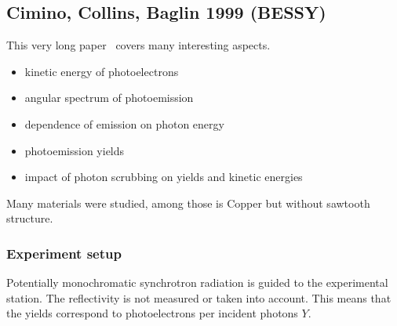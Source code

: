 
\subsection{Cimino, Collins, Baglin 1999 (BESSY)}
\label{sec:Cimino}

This very long paper~\cite{cimino} covers many interesting aspects.
\begin{itemize}
    \item kinetic energy of photoelectrons
    \item angular spectrum of photoemission
    \item dependence of emission on photon energy
    \item photoemission yields
    \item impact of photon scrubbing on yields and kinetic energies
\end{itemize}
Many materials were studied, among those is Copper but without sawtooth structure.

\subsubsection{Experiment setup}

Potentially monochromatic synchrotron radiation is guided to the experimental station.
The reflectivity is not measured or taken into account.
This means that the yields correspond to photoelectrons per incident photons $Y$.

